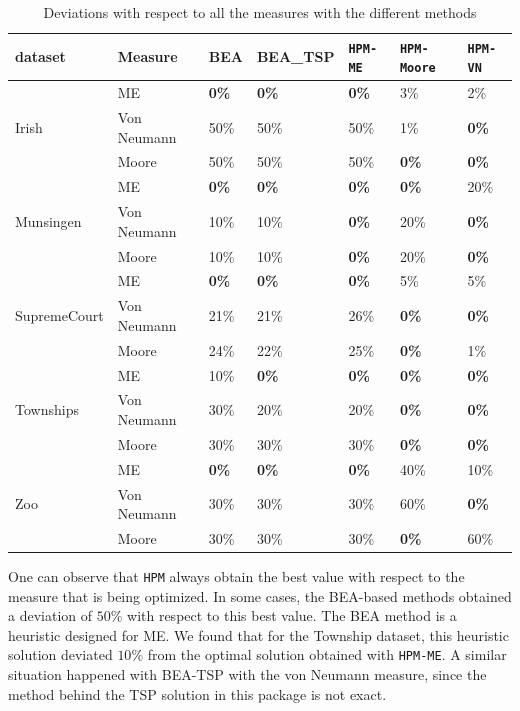 \documentclass[a4paper,11pt, reqno]{amsart}
\begin{document}
\begin{table}[h]
\centering

{\small\begin{tabular}{l l |l l l l l}
dataset & Measure & BEA & BEA\_TSP & \texttt{HPM-ME} & \texttt{HPM-Moore} & \texttt{HPM-VN} \\
\hline
\multirow{3}{*}{Irish} & ME & \textbf{0\%} & \textbf{0\%} & \textbf{0\%} & 3\% & 2\% \\
 & Von Neumann & 50\% & 50\% & 50\% & 1\% & \textbf{0\%} \\
& Moore & 50\% & 50\% & 50\% & \textbf{0\%} & \textbf{0\%} \\
\hline
\multirow{3}{*}{Munsingen} & ME & \textbf{0\%} & \textbf{0\%} & \textbf{0\%}  & \textbf{0\%} & 20\%\\
 & Von Neumann & 10\% & 10\% & \textbf{0\%} & 20\% & \textbf{0\%} \\
 & Moore & 10\% & 10\% & \textbf{0\%} & 20\% & \textbf{0\%} \\
 \hline
\multirow{3}{*}{SupremeCourt} & ME & \textbf{0\%} & \textbf{0\%} & \textbf{0\%} & 5\% & 5\% \\
 & Von Neumann & 21\% & 21\% & 26\% & \textbf{0\%} & \textbf{0\%} \\
 & Moore & 24\% & 22\% & 25\% & \textbf{0\%} & 1\% \\
 \hline
\multirow{3}{*}{Townships} & ME & 10\% & \textbf{0\%} & \textbf{0\%} & \textbf{0\%} & \textbf{0\%} \\
 & Von Neumann & 30\% & 20\% & 20\% & \textbf{0\%} & \textbf{0\%} \\
 & Moore & 30\% & 30\% & 30\% & \textbf{0\%} & \textbf{0\%} \\
 \hline
\multirow{3}{*}{Zoo} & ME & \textbf{0\%} & \textbf{0\%} & \textbf{0\%} & 40\% & 10\% \\
 & Von Neumann & 30\% & 30\% & 30\% & 60\% & \textbf{0\%} \\
 & Moore & 30\% & 30\% & 30\% & \textbf{0\%} & 60\%  \\
\hline
\end{tabular}}
\caption{Deviations with respect to all the measures with the different methods\label{tab:deviations}}
\end{table}

One can observe that \texttt{HPM} always obtain the best value with respect to the measure that is being optimized. 
In some cases, the BEA-based methods obtained a deviation of $50\%$ with respect to this best value. The BEA method is 
a heuristic designed for ME. We found that for the Township dataset, this heuristic solution deviated $10\%$ from the optimal solution obtained with \texttt{HPM-ME}. A similar situation happened with BEA-TSP with the von Neumann measure, since the method behind the TSP solution in this package is not exact. 
\end{document}
